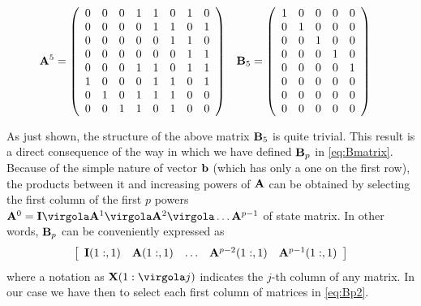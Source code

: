 \begin{align} \label{eq:triex}
\mathbf{A}^5 & =
\left( \begin{array}{cccccccc}
 0 &  0 &  0 &  1 &  1 &  0 &  1 & 0 \\
 0 &  0 &  0 &  0 &  1 &  1 &  0 & 1 \\
 0 &  0 &  0 &  0 &  0 &  1 &  1 & 0 \\
 0 &  0 &  0 &  0 &  0 &  0 &  1 & 1 \\
 0 &  0 &  0 &  1 &  1 &  0 &  1 & 1 \\
 1 &  0 &  0 &  0 &  1 &  1 &  0 & 1 \\
 0 &  1 &  0 &  1 &  1 &  1 &  0 & 0 \\
 0 &  0 &  1 &  1 &  0 &  1 &  0 & 0 \\
\end{array}\right) &
\mathbf{B}_5 & = \left(
\begin{array}{ccccc}
 1 &  0 &  0 &  0 & 0 \\
 0 &  1 &  0 &  0 & 0 \\
 0 &  0 &  1 &  0 & 0 \\
 0 &  0 &  0 &  1 & 0 \\
 0 &  0 &  0 &  0 & 1 \\
 0 &  0 &  0 &  0 & 0 \\
 0 &  0 &  0 &  0 & 0 \\
 0 &  0 &  0 &  0 & 0 \\
\end{array}
\right)
\end{align}

As just shown, the structure of the above matrix $\mathbf{B}_5$ is quite trivial. This result is a direct consequence of the way in which we have defined $\mathbf{B}_p$ in \eqref{eq:Bmatrix}. Because of the simple nature of vector $\mathbf{b}$ (which has only a one on the first row), the products between it and increasing powers of $\mathbf{A}$ can be obtained by selecting the first column of the first $p$ powers \( \vet A^0= \vet I \virgola \vet A^1 \virgola \vet A^2 \virgola \ldots \vet A^{p-1} \) of state matrix. In other words, $\mathbf{B}_p$ can be conveniently expressed as
\begin{equation}\label{eq:Bp2}
\left[
\begin{array}{ccccc}
  \mathbf{I}(1:,1) & \mathbf{A}(1:,1) & \ldots & {\mathbf{A}}^{p-2}(1:,1) &  \mathbf{A}^{p-1}(1:,1)
\end{array}
\right]
\end{equation}
where a notation as \( \vet X(1: \virgola j) \) indicates the \(j\)-th column of any matrix.  In our case we have then to select each first column of matrices in \eqref{eq:Bp2}.

